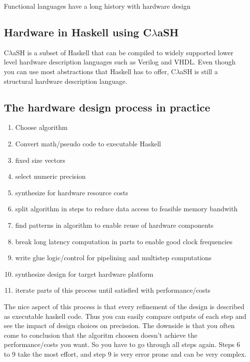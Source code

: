\documentclass[preprint]{sigplanconf}
\def\clash{C$\lambda$aSH\xspace}
\begin{document}
Functional languages have a long history with hardware design \cite{Sheeran2005}

\subsection{Hardware in Haskell using \clash}
\clash \cite{Baaij} is a subset of Haskell that can be compiled to widely supported lower level hardware description languages such as Verilog and VHDL.
Even though you can use most abstractions that Haskell has to offer, \clash is still a structural hardware description language.

\subsection{The hardware design process in practice}
\begin{enumerate}
 \item Choose algorithm
 \item Convert math/pseudo code to executable Haskell
 \item fixed size vectors
 \item select numeric precision
 \item synthesize for hardware resource costs
 \item split algorithm in steps to reduce data access to feasible memory bandwith
 \item find patterns in algorithm to enable reuse of hardware components
 \item break long latency computation in parts to enable good clock frequencies
 \item write glue logic/control for pipelining and multistep computations
 \item synthesize design for target hardware platform
 \item iterate parts of this process until satisfied with performance/costs
\end{enumerate}
The nice aspect of this process is that every refinement of the design is described as executable haskell code.
Thus you can easily compare outputs of each step and see the impact of design choices on precission.
The downside is that you often come to conclusion that the algoritm choosen doesn't achieve the performance/costs you want. So you have to go through all steps again.
Steps 6 to 9 take the most effort, and step 9 is very error prone and can be very complex.
\end{document}
